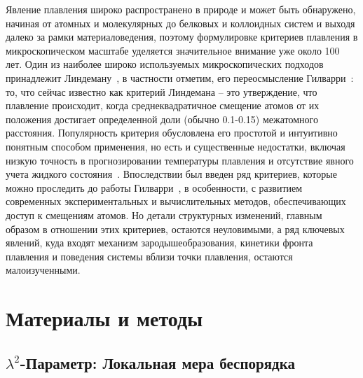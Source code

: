 Явление плавления широко распространено в природе и может быть обнаружено, начиная от атомных и молекулярных до белковых и коллоидных систем и выходя далеко за рамки материаловедения, поэтому формулировке критериев плавления в микроскопическом масштабе уделяется значительное внимание уже около 100 лет.
Один из наиболее широко используемых микроскопических подходов принадлежит Линдеману~\cite{lindemann1910}, в частности отметим, его переосмысление Гилварри~\cite{10.1103/physrev.102.308}: то, что сейчас известно как критерий Линдемана -- это утверждение, что плавление происходит, когда среднеквадратичное смещение атомов от их положения достигает определенной доли (обычно 0.1-0.15) межатомного расстояния.
Популярность критерия обусловлена его простотой и интуитивно понятным способом применения, но есть и существенные недостатки, включая низкую точность в прогнозировании температуры плавления и отсутствие явного учета жидкого состояния~\cite{10.1098/rspa.1991.0068}.
Впоследствии был введен ряд критериев, которые можно проследить до работы Гилварри~\cite{10.1063/1.1426419}, в особенности, с развитием современных экспериментальных и вычислительных методов, обеспечивающих доступ к смещениям атомов.
Но детали структурных изменений, главным образом в отношении этих критериев, остаются неуловимыми, а ряд ключевых явлений, куда входят механизм зародышеобразования, кинетики фронта плавления и поведения системы вблизи точки плавления, остаются малоизученными.


\section{Материалы и методы}

\subsection{$\lambda^2$-Параметр: Локальная мера беспорядка}
\label{SSMF-AppA}

